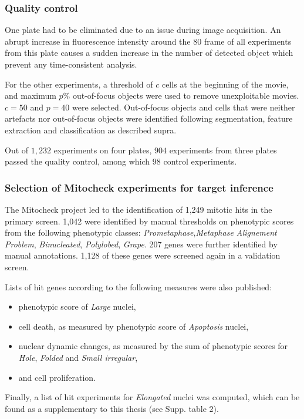 \subsubsection{Quality control}
One plate had to be eliminated due to an issue during image acquisition. An abrupt increase in fluorescence intensity around the 80 frame of all experiments from this plate causes a sudden increase in the number of detected object which prevent any time-consistent analysis.

For the other experiments, a threshold of $c$ cells at the beginning of the movie, and maximum $p$\% out-of-focus objects were used to remove unexploitable movies. $c=50$ and $p=40$ were selected. Out-of-focus objects and cells that were neither artefacts nor out-of-focus objects were identified following segmentation, feature extraction and classification as described supra.

Out of $1,232$ experiments on four plates, $904$ experiments from three plates passed the quality control, among which $98$ control experiments.

\subsubsection{Selection of Mitocheck experiments for target inference}
\label{sec:selection_mitocheck}
The Mitocheck project led to the identification of 1,249 mitotic hits in the primary screen. 1,042 were identified by manual thresholds on phenotypic scores from the following phenotypic classes: \textit{Prometaphase},\textit{Metaphase Alignement Problem}, \textit{Binucleated}, \textit{Polylobed}, \textit{Grape}. 207 genes were further identified by manual annotations. 1,128 of these genes were screened again in a validation screen.

Lists of hit genes according to the following measures were also published:
\begin{itemize}
\item phenotypic score of \textit{Large} nuclei,
\item cell death, as measured by phenotypic score of \textit{Apoptosis} nuclei,
\item nuclear dynamic changes, as measured by the sum of phenotypic scores for \textit{Hole}, \textit{Folded} and \textit{Small irregular},
\item and cell proliferation.
\end{itemize}

Finally, a list of hit experiments for \textit{Elongated} nuclei was computed, which can be found as a supplementary to this thesis (see Supp. table 2).

